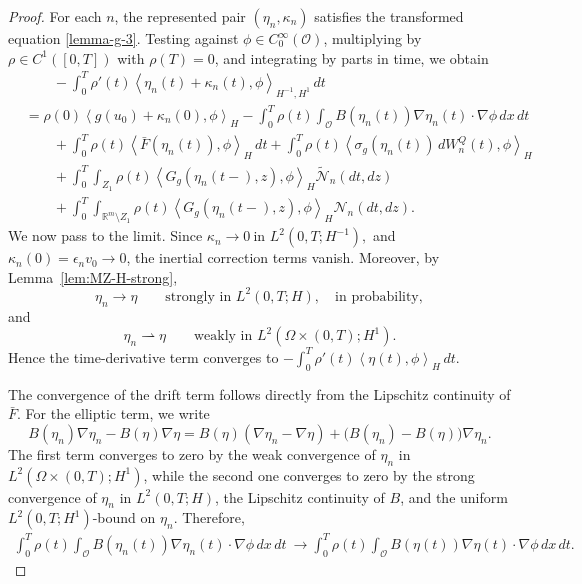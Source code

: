 \documentclass[11pt]{article}
\theoremstyle{plain}
\numberwithin{equation}{section}
\begin{document}
\begin{proof}
For each \(n\), the represented pair \((\eta_n,\kappa_n)\) satisfies the
transformed equation \eqref{lemma-g-3}.
Testing against \(\phi\in C_0^\infty(\mathcal O)\), multiplying by
\(\rho\in C^1([0,T])\) with \(\rho(T)=0\), and integrating by parts in time,
we obtain
\[
\begin{aligned}
&\qquad -\int_0^T \rho'(t)\left\langle\eta_n(t)+\kappa_n(t),\phi \right\rangle_{H^{-1},H^1}\,dt\\
& =\rho(0)\left\langle g(u_0)+\kappa_n(0),\phi\right\rangle_H -
\int_0^T\rho(t)\int_{\mathcal O}B(\eta_n(t))\nabla\eta_n(t)\cdot\nabla\phi\,dx\,dt               \\
&{}\qquad+ \int_0^T\rho(t)\left\langle\bar F(\eta_n(t)),\phi
\right\rangle_H\,dt  +\int_0^T\rho(t)\left\langle\sigma_g(\eta_n(t))\,dW_n^Q(t),\phi \right\rangle_H                                      \\
&{}\qquad+ \int_0^T\int_{Z_1}\rho(t)\left\langle G_g(\eta_n(t-),z),\phi \right\rangle_H \tilde{\mathcal N}_n(dt,dz)                          \\
&{}\qquad + \int_0^T\int_{\mathbb R^m\setminus Z_1}\rho(t)\left\langle G_g(\eta_n(t-),z),\phi \right\rangle_H \mathcal N_n(dt,dz).
\end{aligned}
\]
We now pass to the limit. Since \(\kappa_n\to0~\text{in }L^2(0,T;H^{-1}),\) and \(\kappa_n(0)=\epsilon_n v_0\to0\), the inertial correction terms vanish.
Moreover, by Lemma~\ref{lem:MZ-H-strong},
\[
\eta_n\to\eta\qquad\text{strongly in }L^2(0,T;H),\quad \text{in probability},
\]
and
\[
\eta_n\rightharpoonup\eta\qquad\text{weakly in }L^2(\Omega\times(0,T);H^1).
\]
Hence the time-derivative term converges to \(-\int_0^T\rho'(t)\left\langle\eta(t),\phi\right\rangle_{H}\,dt .\)

The convergence of the drift term follows directly from the Lipschitz continuity of \(\bar F\). For the elliptic term, we write
\[
B(\eta_n)\nabla\eta_n-B(\eta)\nabla\eta=B(\eta)(\nabla\eta_n-\nabla\eta)+\bigl(B(\eta_n)-B(\eta)\bigr)\nabla\eta_n .
\]
The first term converges to zero by the weak convergence of \(\eta_n\) in \(L^2(\Omega\times(0,T);H^1)\), while the second one converges
to zero by the strong convergence of \(\eta_n\) in \(L^2(0,T;H)\), the Lipschitz continuity of \(B\), and the uniform \(L^2(0,T;H^1)\)-bound on
\(\eta_n\). Therefore,
\[
\begin{aligned}
 \int_0^T\rho(t)\int_{\mathcal O} B(\eta_n(t))\nabla\eta_n(t)\cdot\nabla\phi\,dx\,dt ~\longrightarrow
\int_0^T\rho(t)\int_{\mathcal O} B(\eta(t))\nabla\eta(t)\cdot\nabla\phi\,dx\,dt .
\end{aligned}
\]


\end{proof}
\end{document}
